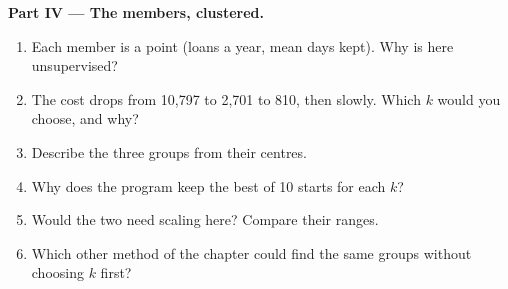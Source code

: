 \begin{problem}
\medskip\noindent\textbf{Part IV --- The members, clustered.}\par\nopagebreak
\begin{enumerate}[resume, beginpenalty=10000]
\item Each member is a point (loans a year, mean days kept). Why is  here unsupervised?
\item The cost drops from 10,797 to 2,701 to 810, then slowly. Which $k$ would you choose, and why?
\item Describe the three groups from their centres.
\item Why does the program keep the best of 10 starts for each $k$?
\item Would the two  need scaling here? Compare their ranges.
\item Which other method of the chapter could find the same groups without choosing $k$ first?
\end{enumerate}
\end{problem}
